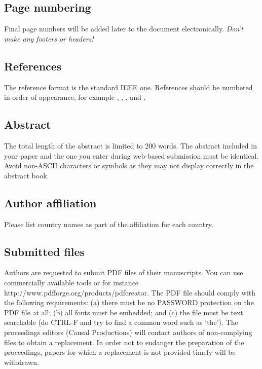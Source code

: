 \subsection{Page numbering}

Final page numbers will be added later to the document electronically. \emph{Don't make any footers or headers!}


\subsection{References}

The reference format is the standard IEEE one. References should be numbered in order of appearance, for example \cite{Davis80-COP}, \cite{Rabiner89-ATO}, \cite[pp.\ 417--422]{Hastie09-TEO}, and \cite{YourName17-XXX}.

\subsection{Abstract}

The total length of the abstract is limited to 200 words. The abstract included in your paper and the one you enter during web-based submission must be identical. Avoid non-ASCII characters or symbols as they may not display correctly in the abstract book.

\subsection{Author affiliation}

Please list country names as part of the affiliation for each country.

\subsection{Submitted files}

Authors are requested to submit PDF files of their manu­scripts. You can use commercially available tools or for instance http://www.pdfforge.org/products/pdfcreator. The PDF file should comply with the following requirements: (a) there must be no PASSWORD protection on the PDF file at all; (b) all fonts must be embedded; and (c) the file must be text searchable (do CTRL-F and try to find a common word such as ‘the’). The proceedings editors (Causal Productions) will contact authors of non-complying files to obtain a replacement. In order not to endanger the preparation of the proceedings, papers for which a replacement is not provided timely will be withdrawn.


